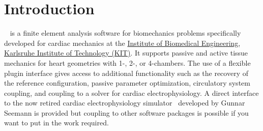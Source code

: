 \section{Introduction}
\label{sec:introduction}

\CM~ is a finite element analysis software for biomechanics problems specifically developed for cardiac mechanics at the \href{https://www.ibt.kit.edu/}{Institute of Biomedical Engineering, Karlsruhe Institute of Technology (KIT)}.
It supports passive and active tissue mechanics for heart geometries with 1-, 2-, or 4-chambers.
The use of a flexible plugin interface gives access to additional functionality such as the recovery of the reference configuration, passive parameter optimization, circulatory system coupling, and coupling to a solver for cardiac electrophysiology.
A direct interface to the now retired cardiac electrophysiology simulator \ACC~developed by Gunnar Seemann \etal is provided but coupling to other software packages is possible if you want to put in the work required.